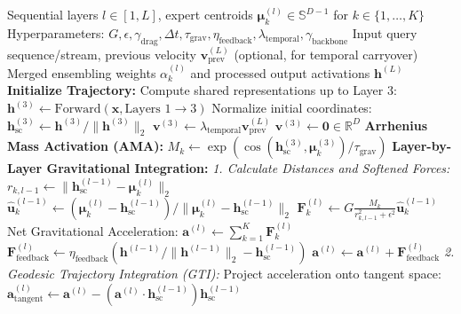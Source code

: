 \begin{algorithm}[H]
\caption{GraviMerge: Physics-Informed Model Merging}
\label{alg:gravimerge}
\begin{algorithmic}[1]
\REQUIRE Sequential layers $l \in [1, L]$, expert centroids $\boldsymbol{\mu}_k^{(l)} \in \mathbb{S}^{D-1}$ for $k \in \{1, \dots, K\}$
\REQUIRE Hyperparameters: $G, \epsilon, \gamma_{\text{drag}}, \Delta t, \tau_{\text{grav}}, \eta_{\text{feedback}}, \lambda_{\text{temporal}}, \gamma_{\text{backbone}}$
\REQUIRE Input query sequence/stream, previous velocity $\mathbf{v}_{\text{prev}}^{(L)}$ (optional, for temporal carryover)
\ENSURE Merged ensembling weights $\alpha_k^{(l)}$ and processed output activations $\mathbf{h}^{(L)}$
\STATE \textbf{Initialize Trajectory:}
\STATE Compute shared representations up to Layer 3: $\mathbf{h}^{(3)} \leftarrow \text{Forward}(\mathbf{x}, \text{Layers } 1 \to 3)$
\STATE Normalize initial coordinates: $\mathbf{h}_{\text{sc}}^{(3)} \leftarrow \mathbf{h}^{(3)} / \|\mathbf{h}^{(3)}\|_2$
    \STATE $\mathbf{v}^{(3)} \leftarrow \lambda_{\text{temporal}} \mathbf{v}_{\text{prev}}^{(L)}$
\ELSE
    \STATE $\mathbf{v}^{(3)} \leftarrow \mathbf{0} \in \mathbb{R}^D$
\ENDIF
\STATE \textbf{Arrhenius Mass Activation (AMA):}
    \STATE $M_k \leftarrow \exp\left( \cos(\mathbf{h}_{\text{sc}}^{(3)}, \boldsymbol{\mu}_k^{(3)}) / \tau_{\text{grav}} \right)$
\ENDFOR
\STATE \textbf{Layer-by-Layer Gravitational Integration:}
    \STATE \textit{1. Calculate Distances and Softened Forces:}
        \STATE $r_{k, l-1} \leftarrow \|\mathbf{h}_{\text{sc}}^{(l-1)} - \boldsymbol{\mu}_k^{(l)}\|_2$
        \STATE $\hat{\mathbf{u}}_k^{(l-1)} \leftarrow (\boldsymbol{\mu}_k^{(l)} - \mathbf{h}_{\text{sc}}^{(l-1)}) / \|\boldsymbol{\mu}_k^{(l)} - \mathbf{h}_{\text{sc}}^{(l-1)}\|_2$
        \STATE $\mathbf{F}_k^{(l)} \leftarrow G \frac{M_k}{r_{k, l-1}^2 + \epsilon^2} \hat{\mathbf{u}}_k^{(l-1)}$
    \ENDFOR
    \STATE Net Gravitational Acceleration: $\mathbf{a}^{(l)} \leftarrow \sum_{k=1}^K \mathbf{F}_k^{(l)}$
        \STATE $\mathbf{F}_{\text{feedback}}^{(l)} \leftarrow \eta_{\text{feedback}} \left( \mathbf{h}^{(l-1)} / \|\mathbf{h}^{(l-1)}\|_2 - \mathbf{h}_{\text{sc}}^{(l-1)} \right)$
        \STATE $\mathbf{a}^{(l)} \leftarrow \mathbf{a}^{(l)} + \mathbf{F}_{\text{feedback}}^{(l)}$
    \ENDIF
    \STATE \textit{2. Geodesic Trajectory Integration (GTI):}
    \STATE Project acceleration onto tangent space: $\mathbf{a}_{\text{tangent}}^{(l)} \leftarrow \mathbf{a}^{(l)} - \left( \mathbf{a}^{(l)} \cdot \mathbf{h}_{\text{sc}}^{(l-1)} \right) \mathbf{h}_{\text{sc}}^{(l-1)}$

\end{algorithmic}
\end{algorithm}
